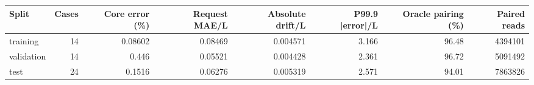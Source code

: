 \begin{tabular}{lrrrrrrr}
\toprule
Split & Cases & Core error (\%) & Request MAE/L & Absolute drift/L & P99.9 |error|/L & Oracle pairing (\%) & Paired reads \\
\midrule
training & 14 & 0.08602 & 0.08469 & 0.004571 & 3.166 & 96.48 & 4394101 \\
validation & 14 & 0.446 & 0.05521 & 0.004428 & 2.361 & 96.72 & 5091492 \\
test & 24 & 0.1516 & 0.06276 & 0.005319 & 2.571 & 94.01 & 7863826 \\
\bottomrule
\end{tabular}
